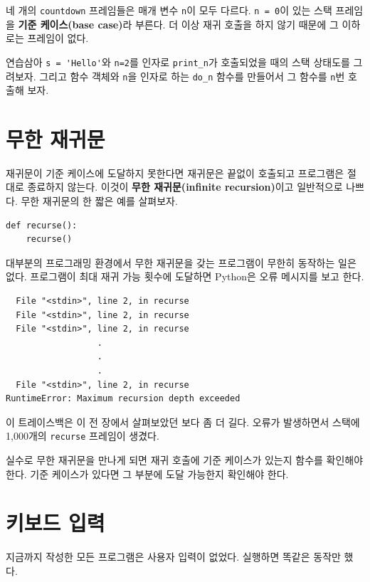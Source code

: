 \documentclass[10pt]{book}
\begin{document}
네 개의 {\tt countdown} 프레임들은 매개 변수 {\tt n}이 모두 다르다.
{\tt n = 0}이 있는 스택 프레임을 {\bf 기준 케이스(base case)}라
부른다.  더 이상 재귀 호출을 하지 않기 때문에 그 이하로는 프레임이
없다.


연습삼아 \verb"s = 'Hello'"와 {\tt n=2}를 인자로 \verb"print_n"가
호출되었을 때의 스택 상태도를 그려보자.  그리고 함수 객체와 {\tt n}을
인자로 하는 \verb"do_n" 함수를 만들어서 그 함수를 {\tt n}번 호출해
보자.


\section{무한 재귀문}

재귀문이 기준 케이스에 도달하지 못한다면 재귀문은 끝없이 호출되고
프로그램은 절대로 종료하지 않는다.  이것이 {\bf 무한 재귀문(infinite
  recursion)}이고 일반적으로 나쁘다.   무한 재귀문의 한 짧은
예를 살펴보자.


\begin{verbatim}
def recurse():
    recurse()
\end{verbatim}
%
대부분의 프로그래밍 환경에서 무한 재귀문을 갖는 프로그램이 무한히
동작하는 일은 없다.  프로그램이 최대 재귀 가능 횟수에 도달하면 Python은
오류 메시지를 보고 한다.

\begin{verbatim}
  File "<stdin>", line 2, in recurse
  File "<stdin>", line 2, in recurse
  File "<stdin>", line 2, in recurse
                  .   
                  .
                  .
  File "<stdin>", line 2, in recurse
RuntimeError: Maximum recursion depth exceeded
\end{verbatim}
%
이 트레이스백은 이 전 장에서 살펴보았던 보다 좀 더 길다.  오류가
발생하면서 스택에 1,000개의 {\tt recurse} 프레임이 생겼다.

실수로 무한 재귀문을 만나게 되면 재귀 호출에 기준 케이스가 있는지
함수를 확인해야 한다.  기준 케이스가 있다면 그 부분에 도달 가능한지
확인해야 한다.



\section{키보드 입력}

지금까지 작성한 모든 프로그램은 사용자 입력이 없었다.  실행하면
똑같은 동작만 했다.
\end{document}
